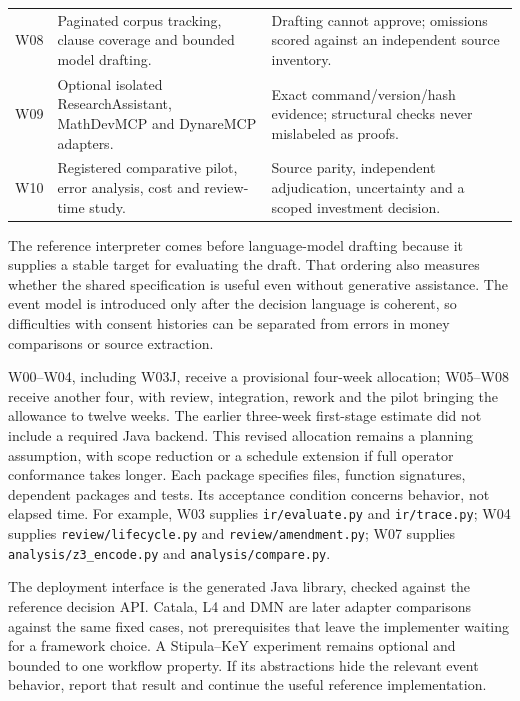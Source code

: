 \begin{longtable}{P{0.12\textwidth}P{0.42\textwidth}P{0.36\textwidth}}
W08 & Paginated corpus tracking, clause coverage and bounded model drafting. & Drafting cannot approve; omissions scored against an independent source inventory.\\
W09 & Optional isolated ResearchAssistant, MathDevMCP and DynareMCP adapters. & Exact command/version/hash evidence; structural checks never mislabeled as proofs.\\
W10 & Registered comparative pilot, error analysis, cost and review-time study. & Source parity, independent adjudication, uncertainty and a scoped investment decision.\\
\bottomrule
\end{longtable}
\endgroup

The reference interpreter comes before language-model drafting because it supplies
a stable target for evaluating the draft. That ordering also measures whether the
shared specification is useful even without generative assistance. The event
model is introduced only after the decision language is coherent, so difficulties
with consent histories can be separated from errors in money comparisons or
source extraction.

W00--W04, including W03J, receive a provisional four-week allocation; W05--W08
receive another four, with review, integration, rework and the pilot bringing
the allowance to twelve weeks. The earlier three-week first-stage estimate did
not include a required Java backend. This revised allocation remains a planning
assumption, with scope reduction or a schedule extension if full operator
conformance takes longer. Each package specifies files, function signatures, dependent
packages and tests. Its acceptance condition concerns behavior, not elapsed time.
For example, W03 supplies \texttt{ir/evaluate.py} and \texttt{ir/trace.py}; W04
supplies \texttt{review/lifecycle.py} and \texttt{review/amendment.py}; W07
supplies \texttt{analysis/z3\_encode.py} and \texttt{analysis/compare.py}.

The deployment interface is the generated Java library, checked against the
reference decision API. Catala, L4 and DMN
are later adapter comparisons against the same fixed cases, not prerequisites
that leave the implementer waiting for a framework choice. A Stipula--KeY
experiment remains optional and bounded to one workflow property. If its
abstractions hide the relevant event behavior, report that result and continue
the useful reference implementation.

